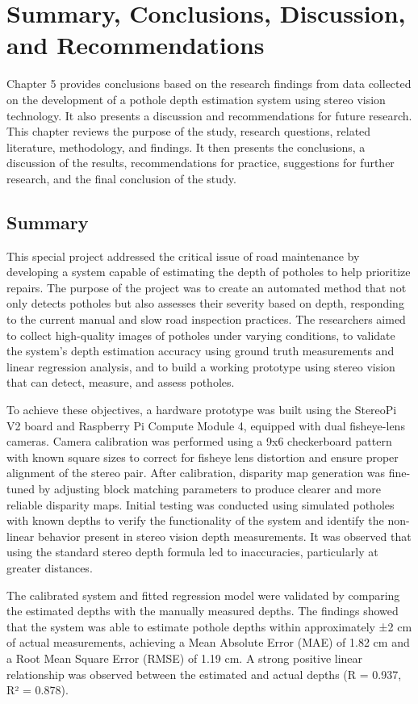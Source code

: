 \chapter{Summary, Conclusions, Discussion, and Recommendations}
Chapter 5 provides conclusions based on the research findings from data collected on the development of a pothole depth estimation system using stereo vision technology. It also presents a discussion and recommendations for future research. This chapter reviews the purpose of the study, research questions, related literature, methodology, and findings. It then presents the conclusions, a discussion of the results, recommendations for practice, suggestions for further research, and the final conclusion of the study.

\section{Summary}
This special project addressed the critical issue of road maintenance by developing a system capable of estimating the depth of potholes to help prioritize repairs. The purpose of the project was to create an automated method that not only detects potholes but also assesses their severity based on depth, responding to the current manual and slow road inspection practices. The researchers aimed to collect high-quality images of potholes under varying conditions, to validate the system’s depth estimation accuracy using ground truth measurements and linear regression analysis, and to build a working prototype using stereo vision that can detect, measure, and assess potholes. 

To achieve these objectives, a hardware prototype was built using the StereoPi V2 board and Raspberry Pi Compute Module 4, equipped with dual fisheye-lens cameras. Camera calibration was performed using a 9x6 checkerboard pattern with known square sizes to correct for fisheye lens distortion and ensure proper alignment of the stereo pair. After calibration, disparity map generation was fine-tuned by adjusting block matching parameters to produce clearer and more reliable disparity maps. Initial testing was conducted using simulated potholes with known depths to verify the functionality of the system and identify the non-linear behavior present in stereo vision depth measurements. It was observed that using the standard stereo depth formula led to inaccuracies, particularly at greater distances. 

The calibrated system and fitted regression model were validated by comparing the estimated depths with the manually measured depths. The findings showed that the system was able to estimate pothole depths within approximately ±2 cm of actual measurements, achieving a Mean Absolute Error (MAE) of 1.82 cm and a Root Mean Square Error (RMSE) of 1.19 cm. A strong positive linear relationship was observed between the estimated and actual depths (R = 0.937, R² = 0.878).

